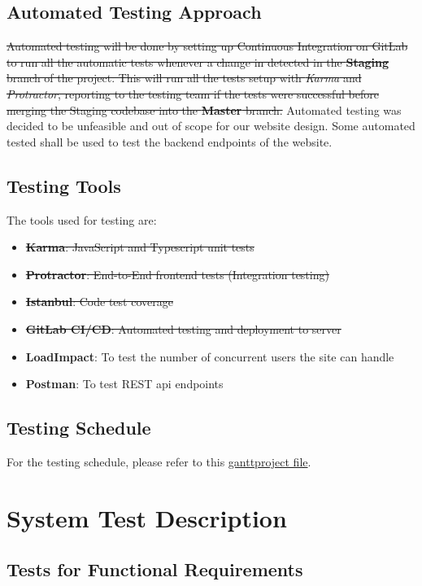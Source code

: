 \documentclass[12pt, titlepage]{article}
\begin{document}
\subsection{Automated Testing Approach}
\sout{
Automated testing will be done by setting up Continuous Integration on GitLab to run all the automatic tests whenever a change in detected in the \textbf{Staging} branch of the project. This will run all the tests setup with \textit{Karma} and \textit{Protractor}, reporting to the testing team if the tests were successful before merging the Staging codebase into the \textbf{Master} branch.} Automated testing was decided to be unfeasible and out of scope for our website design. Some automated tested shall be used to test the backend endpoints of the website.

\subsection{Testing Tools}
The tools used for testing are:
\begin{itemize}
    \item \sout{\textbf{Karma}: JavaScript and Typescript unit tests}
    \item \sout{\textbf{Protractor}: End-to-End frontend tests (Integration testing)}
    \item \sout{\textbf{Istanbul}: Code test coverage}
    \item \sout{\textbf{GitLab CI/CD}: Automated testing and deployment to server}
    \item \textbf{LoadImpact}: To test the number of concurrent users the site can handle
    \item \textbf{Postman}: To test REST api endpoints
\end{itemize}

\subsection{Testing Schedule}
For the testing schedule, please refer to this \href{https://gitlab.cas.mcmaster.ca/coitn/se3xa3-fall2017/tree/dev/Doc/TestPlan/gantt}{ganttproject file}.

\section{System Test Description}
\label{sec:system}

\subsection{Tests for Functional Requirements}
\end{document}
